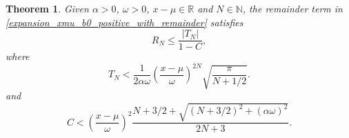 \documentclass[10pt,a4paper,oneside]{article}
\newtheorem{theorem}{Theorem}[section]
\numberwithin{equation}{section}
\begin{document}
\begin{theorem}\label{theorem_expansion_xmu_b0_postivie_remainder}
Given $\alpha > 0$, $\omega > 0$, $x-\mu \in \mathbb{R}$ and $N \in \mathbb{N}$, the remainder term in \eqref{expansion_xmu_b0_positive_with_remainder} satisfies
\begin{equation}\label{bound_remainder_xmu_b0_positive}
R_N \le \frac{|T_N|}{1 - C},
\end{equation}
where
\begin{equation}\label{bound_TN_xmu_b0_positive}
T_N < \frac{1}{2\alpha\omega}\left(\frac{x-\mu}{\omega}\right)^{2N} \sqrt{\frac{\pi}{N + 1/2}}.
\end{equation}
and
\begin{equation}
C < \left(\frac{x-\mu}{\omega}\right)^2 \frac{N + 3/2 + \sqrt{(N + 3/2)^2 + (\alpha\omega)^2}}{2N + 3}.
\end{equation}
\end{theorem}
\end{document}
